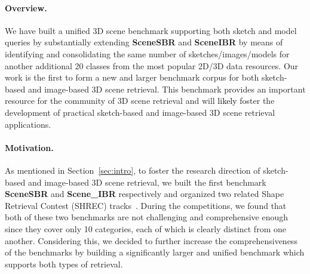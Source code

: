 \documentclass[times, 10pt,twocolumn]{article}
\begin{document}



\label{sec:benchmark}
\paragraph{Overview.} We have built a unified 3D scene benchmark supporting both sketch and model queries by substantially extending \textbf{SceneSBR} and \textbf{SceneIBR} by means of identifying and consolidating the same number of sketches/images/models for another additional 20 classes from the most popular 2D/3D data resources. Our work is the first to form a new and larger benchmark corpus for both sketch-based and image-based 3D scene retrieval. This benchmark provides an important resource for the community of 3D scene retrieval and will \textcolor{black}{likely} foster the development of practical sketch-based and image-based 3D scene retrieval applications.

\paragraph{Motivation.} 
As mentioned in Section~\ref{sec:intro}, to foster the research direction of sketch-based and image-based 3D scene retrieval, we built the first benchmark \textbf{SceneSBR} and \textbf{Scene\_IBR} respectively and organized two related Shape Retrieval Contest (SHREC) tracks~\cite{DBLP:conf/3dor/YuanLL18,  DBLP:conf/3dor/AbdulJLL18}. During the competitions, we found that both of these two benchmarks are not challenging and comprehensive enough since they cover only 10 categories, each of which is clearly distinct from one another. Considering this, we decided to further increase the comprehensiveness of the benchmarks by building a significantly larger and unified benchmark which supports both types of retrieval. 
\end{document}
